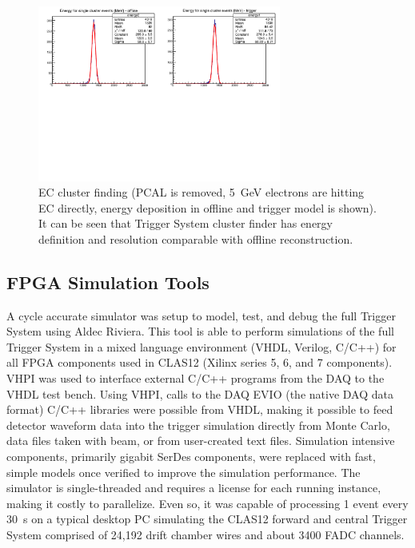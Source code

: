 \begin{figure}[htp]
	\begin{center}
		\centering
		\includegraphics[width=8cm]{img/ecal_sim3.png}
		\caption{EC cluster finding (PCAL is removed, 5~GeV electrons are hitting EC directly, energy deposition in offline and trigger model is shown). It can be seen that Trigger System cluster finder has energy definition and resolution comparable with offline reconstruction.}
		\label{fig:ecal_sim3}
	\end{center}
\end{figure} 


\subsection{FPGA Simulation Tools}

A cycle accurate simulator was setup to model, test, and debug the full Trigger System using Aldec Riviera. This tool is able to perform simulations of the full Trigger System in a mixed language environment (VHDL, Verilog, C/C++) for all FPGA components used in CLAS12 (Xilinx series 5, 6, and 7 components). VHPI was used to interface external C/C++ programs from the DAQ to the VHDL test bench. Using VHPI, calls to the DAQ EVIO (the native DAQ data format) C/C++ libraries were possible from VHDL, making it possible to feed detector waveform data into the trigger simulation directly from Monte Carlo, data files taken with beam, or from user-created text files. Simulation intensive components, primarily gigabit SerDes components, were replaced with fast, simple models once verified to improve the simulation performance. The simulator is single-threaded and requires a license for each running instance, making it costly to parallelize. Even so, it was capable of processing 1 event every 30~s on a typical desktop PC simulating the CLAS12 forward and central Trigger System comprised of 24,192 drift chamber wires and about 3400 FADC channels.

